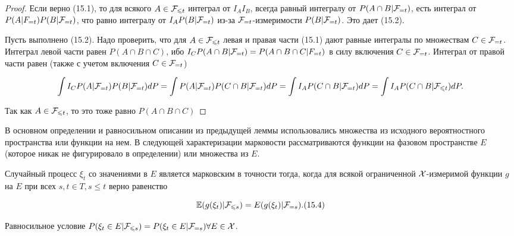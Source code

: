 \begin{proof}
    Если верно (15.1), то для всякого $A \in \mathcal{F}_{\leqslant t}$ интеграл от $I_AI_B$, всегда равный интегралу от $P(A \cap B|\mathcal{F}_{=t})$, есть интеграл от $P(A|F_{=t})P(B|\mathcal{F}_{=t})$, что равно интегралу от $I_A P(B|\mathcal{F}_{=t})$ из-за $\mathcal{F}_{=t}$-измеримости $P(B|\mathcal{F}_{=t})$. Это дает (15.2).
    
    Пусть выполнено (15.2). Надо проверить, что для $A \in \mathcal{F}_{\leqslant t}$ левая и правая части (15.1) дают равные интегралы по множествам $C \in \mathcal{F}_{=t}$. Интеграл левой части равен $P(A \cap B \cap C)$, ибо $I_C P(A \cap B|\mathcal{F}_{=t}) = P(A \cap B \cap C|F_{=t})$ в силу включения $C \in \mathcal{F}_{=t}$. Интеграл от правой части равен (также с учетом включения $C \in \mathcal{F}_{=t}$)

    \[ \int I_C P(A|\mathcal{F}_{=t})P(B|\mathcal{F}_{=t}) dP = \int P(A|\mathcal{F}_{=t})P(C \cap B|\mathcal{F}_{=t}) dP = \int I_A P(C \cap B|\mathcal{F}_{=t}) dP = \int I_A P(C \cap B|\mathcal{F}_{\leqslant t}) dP. \]

    Так как $A \in \mathcal{F}_{\leqslant t}$, то это тоже равно $P(A \cap B \cap C)$    
\end{proof}

В основном определении и равносильном описании из предыдущей леммы использовались множества из исходного вероятностного
пространства или функции на нем. В следующей характеризации марковости рассматриваются функции на фазовом пространстве $E$ (которое никак не фигурировало в определении) или множества из $E$.

\begin{theorem}
    Случайный процесс $\xi_t$ со значениями в $E$ является марковским в точности тогда, когда для всякой ограниченной $\mathcal{X}$-измеримой функции $g$ на $E$ при всех $s, t \in T, s \leq t$ верно равенство
    
    \[ \operatorname{\mathbb{E}}(g(\xi_t)|\mathcal{F}_{\leqslant s}) = E(g(\xi_t)|\mathcal{F}_{=s}). (15.4) \]

    Равносильное условие $P(\xi_t \in E|\mathcal{F}_{\leqslant s}) = P(\xi_t \in E|\mathcal{F}_{=s}) \forall E \in \mathcal{X}$.
\end{theorem}

